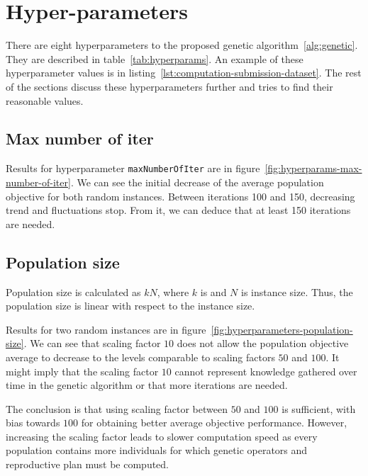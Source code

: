 \newpage


\section{Hyper-parameters}\label{sec:hyper-parameters}

There are eight hyperparameters to the proposed genetic algorithm~\ref{alg:genetic}.
They are described in table~\ref{tab:hyperparams}.
An example of these hyperparameter values is in listing~\ref{lst:computation-submission-dataset}.
The rest of the sections discuss these hyperparameters further and tries to find their reasonable values.

\subsection{Max number of iter}\label{subsec:max-number-of-iter}
Results for hyperparameter \verb|maxNumberOfIter| are in figure~\ref{fig:hyperparams-max-number-of-iter}.
We can see the initial decrease of the average population objective for both random instances.
Between iterations 100 and 150, decreasing trend and fluctuations stop.
From it, we can deduce that at least 150 iterations are needed.

\subsection{Population size}\label{subsec:population-size}

Population size is calculated as $kN$, where $k$ is 
and $N$ is instance size.
Thus, the population size is linear with respect to the instance size.

Results for two random instances are in figure~\ref{fig:hyperparameters-population-size}.
We can see that scaling factor $10$ does not allow
the population objective average to decrease to the levels comparable to scaling factors $50$ and $100$.
It might imply that the scaling factor $10$ cannot represent knowledge gathered over time
in the genetic algorithm or that more iterations are needed.

The conclusion is that using scaling factor between $50$ and $100$ is sufficient, with bias towards $100$
for obtaining better average objective performance.
However, increasing the scaling factor leads to slower computation speed as every population contains
more individuals for which genetic operators and reproductive plan must be computed.

